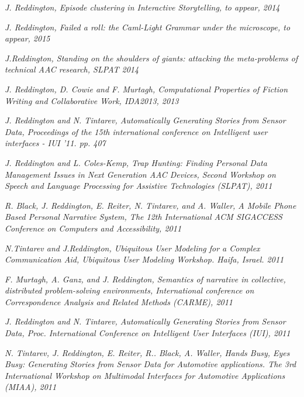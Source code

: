 \documentclass[10pt]{article}
\makeatletter
\newlength{\bibhang}
\newlength{\bibsep}
 {\@listi \global\bibsep\itemsep \global\advance\bibsep by\parsep}
\newenvironment{bibsection}%
        {\vspace{-\baselineskip}\begin{list}{}{%
       \setlength{\leftmargin}{\bibhang}%
       \setlength{\itemindent}{-\leftmargin}%
       \setlength{\itemsep}{\bibsep}%
       \setlength{\parsep}{\z@}%
        \setlength{\partopsep}{0pt}%
        \setlength{\topsep}{0pt}}}
        {\end{list}\vspace{-.6\baselineskip}}
\makeatother
\begin{document}
\begin{bibsection}
\item{\em J. Reddington, Episode clustering in Interactive Storytelling, to appear, 2014}
\item{\em J. Reddington, Failed a roll: the Caml-Light Grammar under the microscope, to appear, 2015}

\item{\em J.Reddington, Standing on the shoulders of giants: attacking the meta-problems of technical AAC research, SLPAT 2014}


\item{\em J. Reddington, D. Cowie and F. Murtagh, Computational Properties of Fiction Writing and Collaborative Work, IDA2013, 2013}

\item{\em  J. Reddington and N. Tintarev,  Automatically Generating Stories from Sensor Data,  Proceedings of the 15th international conference on Intelligent user interfaces - IUI '11. pp. 407} 

\item{\em J. Reddington and L. Coles-Kemp,  Trap Hunting: Finding Personal Data Management Issues in Next Generation AAC Devices, Second Workshop on Speech and Language Processing for Assistive Technologies (SLPAT), 2011} 

\item {\em R. Black, J. Reddington, E. Reiter, N. Tintarev, and A. Waller,  A Mobile Phone Based Personal Narrative System, The 12th International ACM SIGACCESS Conference on Computers and Accessibility, 2011}

\item{\em N.Tintarev and J.Reddington,  Ubiquitous User Modeling for a Complex Communication Aid, Ubiquitous User Modeling Workshop. Haifa, Israel. 2011} 

\item {\em F. Murtagh, A. Ganz, and J. Reddington, Semantics of narrative in collective, distributed problem-solving environments, International conference on Correspondence Analysis and Related Methods  (CARME), 2011}


\item {\em J. Reddington and N. Tintarev, Automatically Generating Stories from Sensor Data, Proc. International Conference on Intelligent User Interfaces (IUI), 2011}

\item {\em N. Tintarev, J. Reddington,  E. Reiter, R.. Black, A. Waller,  Hands Busy, Eyes Busy: Generating Stories from Sensor Data for Automotive applications.  The 3rd  International Workshop on Multimodal Interfaces for Automotive Applications (MIAA), 2011}


\end{bibsection}
\end{document}
